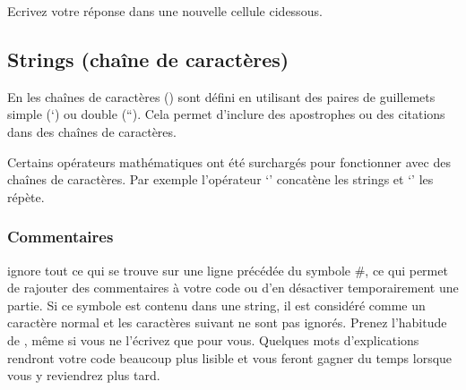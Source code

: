 \documentclass[letterpaper,10pt,english]{sphinxmanual}
\begin{document}
Ecrivez votre réponse dans une nouvelle cellule ci\sphinxhyphen{}dessous.


\subsection{Strings (chaîne de caractères)}
\label{\detokenize{src/OCI01_Introduction:strings-chaine-de-caracteres}}
En  les chaînes de caractères () sont défini en utilisant des paires de guillemets simple (‘) ou double (“). Cela permet d’inclure des apostrophes ou des citations dans des chaînes de caractères.

\begin{sphinxVerbatim}[commandchars=\\\{\}]
\end{sphinxVerbatim}

Certains opérateurs mathématiques ont été surchargés pour fonctionner avec des chaînes de caractères. Par exemple l’opérateur ‘\sphinxstylestrong{+}’ concatène les strings et ‘\sphinxstylestrong{*}’ les répète.

\begin{sphinxVerbatim}[commandchars=\\\{\}]
    
\end{sphinxVerbatim}

\begin{sphinxVerbatim}[commandchars=\\\{\}]
  
\end{sphinxVerbatim}


\subsubsection{Commentaires}
\label{\detokenize{src/OCI01_Introduction:commentaires}}
 ignore tout ce qui se trouve sur une ligne précédée du symbole \#, ce qui permet de rajouter des commentaires à votre code ou d’en désactiver temporairement une partie.
Si ce symbole est contenu dans une string, il est considéré comme un caractère normal et les caractères suivant ne sont pas ignorés.
Prenez l’habitude de , même si vous ne l’écrivez que pour vous. Quelques mots d’explications rendront votre code beaucoup plus lisible et vous feront gagner du temps lorsque vous y reviendrez plus tard.
\end{document}
